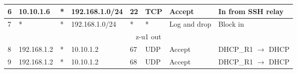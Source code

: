\documentclass[a4paper, 11pt, oneside]{article}
\begin{document}
\begin{table}[H]
{\begin{tabular}{|llllllll|}
\multicolumn{1}{|l|}{6}                         & \multicolumn{1}{l|}{10.10.1.6}                                                    & \multicolumn{1}{l|}{*}                                                              & \multicolumn{1}{l|}{192.168.1.0/24}                                                    & \multicolumn{1}{l|}{22}                                                                  & \multicolumn{1}{l|}{TCP}               & \multicolumn{1}{l|}{Accept}          & In from SSH relay                      \\ \hline
\multicolumn{1}{|l|}{7}                         & \multicolumn{1}{l|}{*}                                                            & \multicolumn{1}{l|}{*}                                                              & \multicolumn{1}{l|}{192.168.1.0/24}                                                    & \multicolumn{1}{l|}{*}                                                                   & \multicolumn{1}{l|}{*}                 & \multicolumn{1}{l|}{Log and drop}    & Block in                               \\ \hline
\multicolumn{8}{|c|}{{\color[HTML]{FE0000} z-u1 out}}                                                                                                                                                                                                                                                                                                                                                                                                                                                                                  \\ \hline
\multicolumn{1}{|l|}{8}                         & \multicolumn{1}{l|}{192.168.1.2}                                                  & \multicolumn{1}{l|}{*}                                                          & \multicolumn{1}{l|}{10.10.1.2}                                                         & \multicolumn{1}{l|}{67}                                                               & \multicolumn{1}{l|}{UDP}               & \multicolumn{1}{l|}{Accept}          & DHCP\_R1 $\rightarrow$ DHCP            \\ \hline
\multicolumn{1}{|l|}{9}                         & \multicolumn{1}{l|}{192.168.1.2}                                                  & \multicolumn{1}{l|}{*}                                                          & \multicolumn{1}{l|}{10.10.1.2}                                                         & \multicolumn{1}{l|}{68}                                                               & \multicolumn{1}{l|}{UDP}               & \multicolumn{1}{l|}{Accept}          & DHCP\_R1 $\rightarrow$ DHCP            \\ \hline

\end{tabular}}
\end{table}
\end{document}
